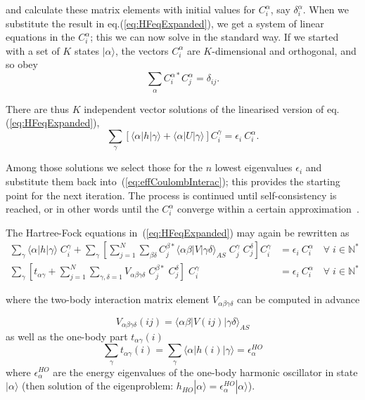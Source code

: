 and calculate these matrix elements with initial values for $C_i^\alpha$, say  $\delta_i^\alpha$. When we substitute the result in eq.(\ref{eq:HFeqExpanded}), we get a system of linear equations in the $C_i^\alpha$; this we can now solve in the standard way. If we started with a set of $K$ states $| \alpha \rangle$, the vectors $C_i^\alpha$ are $K$-dimensional and orthogonal, and so obey
\[
\sum_{\alpha} C_i^{\alpha *} C_j^\alpha = \delta_{ij}.
\]

There are thus $K$ independent vector solutions of the linearised version of eq.(\ref{eq:HFeqExpanded}),
\begin{equation}
\nonumber
\sum_\gamma \left[ \langle \alpha | h| \gamma \rangle +  \langle \alpha | U| \gamma \rangle \right] C_i^\gamma = \epsilon_i \ C_i^\alpha.
\end{equation}

Among those solutions we select those for the $n$ lowest eigenvalues $\epsilon_i$ and substitute them back into~(\ref{eq:effCoulombInterac}); this provides the starting point for the next iteration. The process is continued until self-consistency is reached, or in other words until the $C_i^\alpha$ converge within a certain approximation~\cite{Moshinsky}.


The Hartree-Fock equations in~(\ref{eq:HFeqExpanded}) may again be rewritten as
\begin{align}
\nonumber
\sum_\gamma \langle \alpha | h| \gamma \rangle \; C_i^\gamma +   \sum_\gamma \left[ \sum_{j=1}^N \sum_{\beta \delta} C_j^{\beta *} \langle \alpha \beta | V | \gamma  \delta \rangle_{AS}  \; C_j^\gamma \; C_j^\delta \right] C_i^\gamma &= \epsilon_i \ C_i^\alpha \quad \forall \; i \in \mathbb{N}^* \\
\sum_\gamma \left[ t_{\alpha \gamma} +   \sum_{j=1}^N \sum_{\gamma,\delta=1} V_{\alpha \beta \gamma \delta} \; C_j^{\beta *}  \; C_j^\delta \right] \; C_i^\gamma &= \epsilon_i \ C_i^\alpha \quad \forall \; i \in \mathbb{N}^*
\end{align}

where the two-body interaction matrix element $V_{\alpha \beta \gamma \delta}$ can be computed in advance

\begin{equation}
\label{twoBodyElement}
 V_{\alpha \beta \gamma \delta}(ij) =   \langle \alpha \beta | V(ij) | \gamma  \delta \rangle_{AS}
\end{equation}
as well as the one-body part $t_{\alpha \gamma}(i)$
\begin{equation}
\nonumber
\sum_\gamma t_{\alpha \gamma}(i) = \sum_\gamma \langle \alpha |h(i)| \gamma \rangle = \epsilon^{HO}_\alpha
\end{equation}
where $\epsilon^{HO}_\alpha$ are the energy eigenvalues of the one-body harmonic oscillator in state $|\alpha \rangle$ (then solution of the eigenproblem: $h_{HO} | \alpha \rangle =  \epsilon^{HO}_\alpha | \alpha \rangle$).


